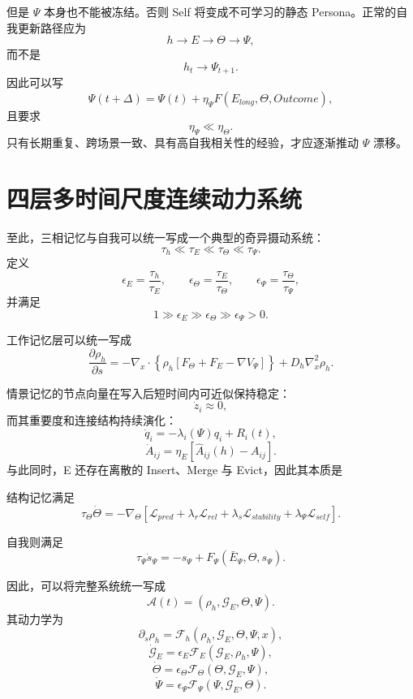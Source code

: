但是 $\Psi$ 本身也不能被冻结。否则 Self 将变成不可学习的静态 Persona。正常的自我更新路径应为
\[
h
\rightarrow
E
\rightarrow
\Theta
\rightarrow
\Psi,
\]
而不是
\[
h_t
\rightarrow
\Psi_{t+1}.
\]
因此可以写
\[
\Psi(t+\Delta)
=
\Psi(t)
+
\eta_\Psi
F
\left(
E_{long},
\Theta,
Outcome
\right),
\]
且要求
\[
\eta_\Psi
\ll
\eta_\Theta.
\]
只有长期重复、跨场景一致、具有高自我相关性的经验，才应逐渐推动 $\Psi$ 漂移。

\section{四层多时间尺度连续动力系统}

至此，三相记忆与自我可以统一写成一个典型的奇异摄动系统：
\[
\tau_h
\ll
\tau_E
\ll
\tau_\Theta
\ll
\tau_\Psi.
\]
定义
\[
\epsilon_E
=
\frac{\tau_h}{\tau_E},
\qquad
\epsilon_\Theta
=
\frac{\tau_E}{\tau_\Theta},
\qquad
\epsilon_\Psi
=
\frac{\tau_\Theta}{\tau_\Psi},
\]
并满足
\[
1
\gg
\epsilon_E
\gg
\epsilon_\Theta
\gg
\epsilon_\Psi
>
0.
\]

工作记忆层可以统一写成
\[
\frac{\partial\rho_h}{\partial s}
=
-
\nabla_x\cdot
\left\{
\rho_h
\left[
F_\Theta
+
F_E
-
\nabla V_\Psi
\right]
\right\}
+
D_h\nabla_x^2\rho_h.
\]

情景记忆的节点向量在写入后短时间内可近似保持稳定：
\[
\dot z_i
\approx
0,
\]
而其重要度和连接结构持续演化：
\[
\dot q_i
=
-\lambda_i(\Psi)q_i
+
R_i(t),
\]
\[
\dot A_{ij}
=
\eta_E
\left[
\widehat{A}_{ij}(h)
-
A_{ij}
\right].
\]
与此同时，E 还存在离散的 Insert、Merge 与 Evict，因此其本质是
\begin{statementbox}
\centering
{}
\end{statementbox}

结构记忆满足
\[
\tau_\Theta
\dot\Theta
=
-
\nabla_\Theta
\left[
\mathcal{L}_{pred}
+
\lambda_r\mathcal{L}_{rel}
+
\lambda_s\mathcal{L}_{stability}
+
\lambda_\Psi\mathcal{L}_{self}
\right].
\]

自我则满足
\[
\tau_\Psi
\dot s_\Psi
=
-s_\Psi
+
F_\Psi
\left(
\bar E_\Psi,\Theta,s_\Psi
\right).
\]

因此，可以将完整系统统一写成
\[
\boxed{
\mathcal{A}(t)
=
\left(
\rho_h,
\mathcal{G}_E,
\Theta,
\Psi
\right).
}
\]
其动力学为
\[
\partial_s\rho_h
=
\mathcal{F}_h
\left(
\rho_h,\mathcal{G}_E,\Theta,\Psi,x
\right),
\]
\[
\dot{\mathcal{G}}_E
=
\epsilon_E
\mathcal{F}_E
\left(
\mathcal{G}_E,\rho_h,\Psi
\right),
\]
\[
\dot\Theta
=
\epsilon_\Theta
\mathcal{F}_\Theta
\left(
\Theta,\mathcal{G}_E,\Psi
\right),
\]
\[
\dot\Psi
=
\epsilon_\Psi
\mathcal{F}_\Psi
\left(
\Psi,\mathcal{G}_E,\Theta
\right).
\]


